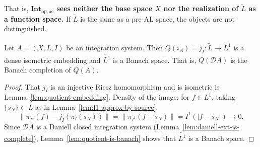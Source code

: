 \noindent
That is, \textbf{$\mathbf{Int}_{\mathrm{op},\mathrm{ae}}$ sees neither the base
space $X$ nor the realization of $\widetilde{L}$ as a function space.}
If $\widetilde{L}$ is the same as a pre-AL space, the objects are not
distinguished.

\begin{proposition}\label{prop:D-op-is-banach-completion}
  Let $A=(X,L,I)$ be an integration system. Then
  $Q(i_A)=j_I:\widetilde{L}\to\widetilde{L^1}$ is a dense isometric embedding
  and $\widetilde{L^1}$ is a Banach space.
  That is, $Q(\mathcal{D}A)$ is the Banach completion of $Q(A)$.
\end{proposition}
\begin{proof}
  That $j_I$ is an injective Riesz homomorphism and is isometric is
  Lemma~\ref{lem:quotient-embedding}.
  Density of the image: for $f\in L^1$, taking $\{s_N\}\subset L$ as in
  Lemma~\ref{lem:l1-approx-by-source},
  \[
    \|\pi_{I^1}(f)-j_I(\pi_I(s_N))\|
    =\|\pi_{I^1}(f-s_N)\|
    =I^1(|f-s_N|)
    \longrightarrow0.
  \]
  Since $\mathcal{D}A$ is a Daniell closed integration system
  (Lemma~\ref{lem:daniell-ext-is-complete}),
  Lemma~\ref{lem:quotient-is-banach} shows that $\widetilde{L^1}$ is a Banach
  space.
\end{proof}

